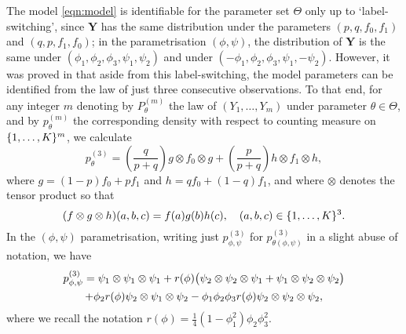 \documentclass[journal]{IEEEtran}
\newcommand{\1}{\boldsymbol{1}}
\DeclarePairedDelimiter{\braces}{\{}{\}}
\DeclarePairedDelimiter{\brackets}{(}{)}
\begin{document}
	The model \eqref{eqn:model} is identifiable for the parameter set $\Theta$ only up to `label-switching', since $\bm{Y}$ has the same distribution under the parameters $(p,q,f_0,f_1)$ and $(q,p,f_1,f_0)$; in the parametrisation $(\phi,\psi)$, the distribution of $\bm{Y}$ is the same under $(\phi_1,\phi_2,\phi_3,\psi_1,\psi_2)$ and under $(-\phi_1,\phi_2,\phi_3,\psi_1,-\psi_2)$. However, it was proved in \cite{AGHKT14} that aside from this label-switching, the model parameters can be identified from the law of just three consecutive observations. To that end, for any integer $m$ denoting by $P_{\theta}^{(m)}$ the law of $(Y_1,\dots,Y_m)$ under parameter %
	$\theta\in\Theta$, and by $p_\theta^{(m)}$ the corresponding density with respect to counting measure on $\braces{1,\dots,K}^m$, we calculate
	\begin{equation}
		\label{eqn:ThreeStepLaw}
		p_{\theta}^{(3)}=\left(\frac{q}{p + q}\right) g \otimes f_0 \otimes g
		+ \left(\frac{p}{p + q}\right) h \otimes f_1 \otimes h,
	\end{equation}
	where $g=(1-p) f_0 + p f_1$ and $h= q f_0 + (1-q) f_1$, and where
	$\otimes$ denotes the tensor product so that
	\[(f\otimes g \otimes h) (a,b,c)= f(a)g(b)h(c),\quad (a,b,c)\in\braces{1,\dots,K}^3.\]
	In the $(\phi,\psi)$ parametrisation, writing just
	$p^{(3)}_{\phi,\psi}$ for $p^{(3)}_{\theta(\phi,\psi)}$ in a slight abuse of notation, we have
	\begin{multline}
		\label{eq:17}
		p^{(3)}_{\phi,\psi} =\psi_1\otimes \psi_1 \otimes \psi_1 + r(\phi)\brackets[\big]{\psi_2\otimes \psi_2 \otimes \psi_1 +\psi_1 \otimes \psi_2 \otimes \psi_2}\\%
		+  \phi_2 r(\phi) \psi_2\otimes \psi_1 \otimes \psi_2 - \phi_1\phi_2\phi_3 r(\phi) \psi_2\otimes \psi_2\otimes \psi_2,
	\end{multline}
	where we recall the notation $r(\phi)=\tfrac{1}{4}(1-\phi_1^2)\phi_2\phi_3^2$.
\end{document}

